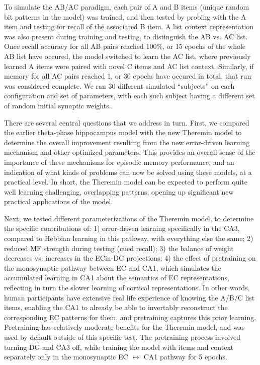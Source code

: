 \documentclass[11pt,twoside]{article}
\newif\myifpdf
\begin{document}
To simulate the AB/AC paradigm, each pair of A and B items (unique random bit patterns in the model) was trained, and then tested by probing with the A item and testing for recall of the associated B item.  A list context representation was also present during training and testing, to distinguish the AB vs. AC list.  Once recall accuracy for all AB pairs reached 100\%, or 15 epochs of the whole AB list have occured, the model switched to learn the AC list, where previously learned A items were paired with novel C items and AC list context. Similarly, if memory for all AC pairs reached 1, or 30 epochs have occured in total, that run was considered complete.  We ran 30 different simulated ``subjects'' on each configuration and set of parameters, with each such subject having a different set of random initial synaptic weights. 

There are several central questions that we address in turn.  First, we compared the earlier theta-phase hippocampus model with the new Theremin model to determine the overall improvement resulting from the new error-driven learning mechanism and other optimized parameters.  This provides an overall sense of the importance of these mechanisms for episodic memory performance, and an indication of what kinds of problems can now be solved using these models, at a practical level.  In short, the Theremin model can be expected to perform quite well learning challenging, overlapping patterns, opening up significant new practical applications of the model.

Next, we tested different parameterizations of the Theremin model, to determine the specific contributions of: 1) error-driven learning specifically in the CA3, compared to Hebbian learning in this pathway, with everything else the same; 2) reduced MF strength during testing (cued recall); 3) the balance of weight decreases vs. increases in the ECin-DG projections; 4) the effect of pretraining on the monosynaptic pathway between EC and CA1, which simulates the accumulated learning in CA1 about the semantics of EC representations, reflecting in turn the slower learning of cortical representations. In other words, human participants have extensive real life experience of knowing the A/B/C list items, enabling the CA1 to already be able to invertably reconstruct the corresponding EC patterns for them, and pretraining captures this prior learning.  Pretraining has relatively moderate benefits for the Theremin model, and was used by default outside of this specific test.  The pretraining process involved turning DG and CA3 off, while training the model with items and context separately only in the monosynaptic EC $\leftrightarrow$ CA1 pathway for 5 epochs. 
\end{document}
